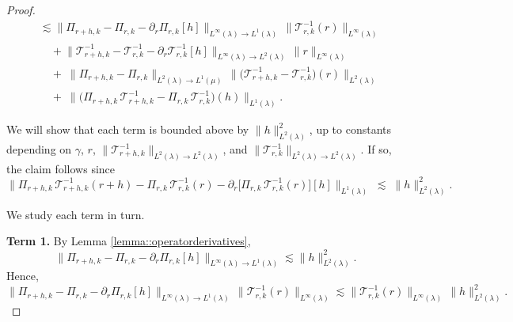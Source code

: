\documentclass[11pt]{article}
\theoremstyle{plain}
\begin{document}
\begin{proof}
\begin{align*}
&\lesssim \big\|\Pi_{r+h,k}-\Pi_{r,k}-\partial_r \Pi_{r,k}[h]\big\|_{L^\infty(\lambda) \to L^1(\lambda)} \,\big\|\mathcal{T}_{r,k}^{-1}(r)\big\|_{L^\infty(\lambda)} \\
&\quad+ \big\|\mathcal{T}_{r+h,k}^{-1}-\mathcal{T}_{r,k}^{-1}-\partial_r \mathcal{T}_{r,k}^{-1}[h]\big\|_{L^\infty(\lambda) \to L^2(\lambda)} \,\|r\|_{L^\infty(\lambda)} \\
&\quad+\;\big\|\Pi_{r+h,k}-\Pi_{r,k}\big\|_{L^2(\lambda) \to L^1(\mu)}\,\big\|\big(\mathcal{T}_{r+h,k}^{-1}-\mathcal{T}_{r,k}^{-1}\big)(r)\big\|_{L^2(\lambda)} \\
&\quad+\;\big\|\big(\Pi_{r+h,k}\,\mathcal{T}_{r+h,k}^{-1}-\Pi_{r,k}\,\mathcal{T}_{r,k}^{-1}\big)(h)\big\|_{L^1(\lambda)}.
\end{align*}

We will show that each term is bounded above by $\|h\|_{L^2(\lambda)}^2$, up to constants depending on $\gamma$, $r$, $\|\mathcal{T}_{r+h,k}^{-1}\|_{L^2(\lambda)\to L^2(\lambda)}$, and $\|\mathcal{T}_{r,k}^{-1}\|_{L^2(\lambda)\to L^2(\lambda)}$. If so, the claim follows since
\[
\big\|\Pi_{r+h,k}\,\mathcal{T}_{r+h,k}^{-1}(r+h) - \Pi_{r,k}\,\mathcal{T}_{r,k}^{-1}(r) - \partial_r\!\big[\Pi_{r,k}\,\mathcal{T}_{r,k}^{-1}(r)\big][h]\big\|_{L^1(\lambda)} 
\;\lesssim\; \|h\|_{L^2(\lambda)}^2.
\]



We study each term in turn.

\medskip
\noindent \textbf{Term 1.}
By Lemma \ref{lemma::operatorderivatives},
\[
\big\|\Pi_{r+h,k}-\Pi_{r,k}-\partial_r \Pi_{r,k}[h]\big\|_{L^\infty(\lambda) \to L^1(\lambda)} \lesssim \|h\|_{L^2(\lambda)}^2.
\]
Hence,
\[
\big\|\Pi_{r+h,k}-\Pi_{r,k}-\partial_r \Pi_{r,k}[h]\big\|_{L^\infty(\lambda) \to L^1(\lambda)} \,\big\|\mathcal{T}_{r,k}^{-1}(r)\big\|_{L^\infty(\lambda)}
\lesssim \big\|\mathcal{T}_{r,k}^{-1}(r)\big\|_{L^\infty(\lambda)} \,\|h\|_{L^2(\lambda)}^2.
\]


\end{proof}
\end{document}

